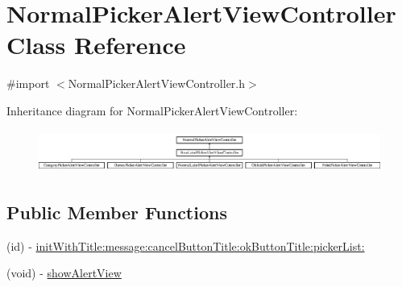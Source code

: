 \hypertarget{interface_normal_picker_alert_view_controller}{
\section{NormalPickerAlertViewController Class Reference}
\label{interface_normal_picker_alert_view_controller}
}


{\ttfamily \#import $<$NormalPickerAlertViewController.h$>$}

Inheritance diagram for NormalPickerAlertViewController:\begin{figure}[H]
\begin{center}
\leavevmode
\includegraphics[height=1.411765cm]{interface_normal_picker_alert_view_controller}
\end{center}
\end{figure}
\subsection*{Public Member Functions}
\begin{DoxyCompactItemize}
\item 
(id) -\/ \hyperlink{interface_normal_picker_alert_view_controller_a386eae2a2ba84bce05ff99615a432bcd}{initWithTitle:message:cancelButtonTitle:okButtonTitle:pickerList:}
\item 
(void) -\/ \hyperlink{interface_normal_picker_alert_view_controller_a0b9f9e91d9e466f137630d1b364fef4c}{showAlertView}
\end{DoxyCompactItemize}
